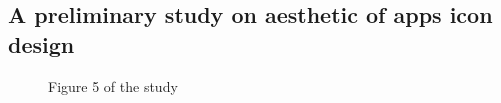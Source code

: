 \documentclass[a4paper,11pt] {article}
\theoremstyle{definition}
\begin{document}
    \subsection{A preliminary study on aesthetic of apps icon design\cite{jpAnalitics}}
      \begin{figure}[H] 
        \caption{Figure 5 of the study}\label{jpfig5}
      \end{figure}
      
\end{document}
